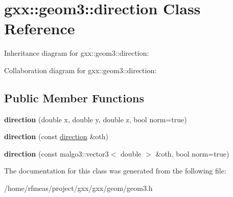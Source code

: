 \hypertarget{classgxx_1_1geom3_1_1direction}{}\section{gxx\+:\+:geom3\+:\+:direction Class Reference}
\label{classgxx_1_1geom3_1_1direction}


Inheritance diagram for gxx\+:\+:geom3\+:\+:direction\+:


Collaboration diagram for gxx\+:\+:geom3\+:\+:direction\+:
\subsection*{Public Member Functions}
\begin{DoxyCompactItemize}
\item 
{\bfseries direction} (double x, double y, double z, bool norm=true)\hypertarget{classgxx_1_1geom3_1_1direction_a6358587d647d516db1083f64e1fd68da}{}\label{classgxx_1_1geom3_1_1direction_a6358587d647d516db1083f64e1fd68da}

\item 
{\bfseries direction} (const \hyperlink{classgxx_1_1geom3_1_1direction}{direction} \&oth)\hypertarget{classgxx_1_1geom3_1_1direction_ad1915bd7cbea2e42ad61bb1e5362691e}{}\label{classgxx_1_1geom3_1_1direction_ad1915bd7cbea2e42ad61bb1e5362691e}

\item 
{\bfseries direction} (const malgo3\+::vector3$<$ double $>$ \&oth, bool norm=true)\hypertarget{classgxx_1_1geom3_1_1direction_a431eb925ed7a72e7491d149da2b58ab9}{}\label{classgxx_1_1geom3_1_1direction_a431eb925ed7a72e7491d149da2b58ab9}

\end{DoxyCompactItemize}


The documentation for this class was generated from the following file\+:\begin{DoxyCompactItemize}
\item 
/home/rfmeas/project/gxx/gxx/geom/geom3.\+h\end{DoxyCompactItemize}
